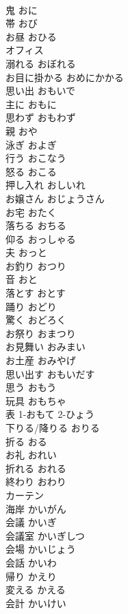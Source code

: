 \documentclass[8pt]{extreport}
\begin{document}
\begin{CJK}{UTF8}{min}
\\	鬼	おに	
\\	帯	おび	
\\	お昼	おひる	
\\	オフィス		
\\	溺れる	おぼれる	
\\	お目に掛かる	おめにかかる	
\\	思い出	おもいで	
\\	主に	おもに	
\\	思わず	おもわず	
\\	親	おや	
\\	泳ぎ	およぎ	
\\	行う	おこなう	
\\	怒る	おこる	
\\	押し入れ	おしいれ	
\\	お嬢さん	おじょうさん	
\\	お宅	おたく	
\\	落ちる	おちる	
\\	仰る	おっしゃる	
\\	夫	おっと	
\\	お釣り	おつり	
\\	音	おと	
\\	落とす	おとす	
\\	踊り	おどり	
\\	驚く	おどろく	
\\	お祭り	おまつり	
\\	お見舞い	おみまい	
\\	お土産	おみやげ	
\\	思い出す	おもいだす	
\\	思う	おもう	
\\	玩具	おもちゃ	
\\	表	1-おもて 2-ひょう	
\\	下りる/降りる	おりる	
\\	折る	おる	
\\	お礼	おれい	
\\	折れる	おれる	
\\	終わり	おわり	
\\	カーテン		
\\	海岸	かいがん	
\\	会議	かいぎ	
\\	会議室	かいぎしつ	
\\	会場	かいじょう	
\\	会話	かいわ	
\\	帰り	かえり	
\\	変える	かえる	
\\	会計	かいけい	

\end{CJK}
\end{document}

